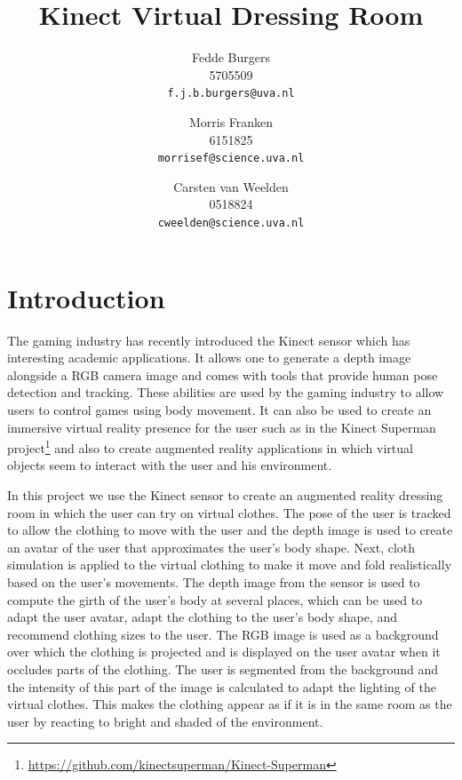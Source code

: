 \documentclass[a4paper]{article}
\title{Kinect Virtual Dressing Room}
\author{Fedde Burgers \\ 5705509 \\ \texttt{f.j.b.burgers@uva.nl} \and Morris Franken \\ 6151825 \\ \texttt{morrisef@science.uva.nl} \and Carsten van Weelden \\ 0518824 \\ \texttt{cweelden@science.uva.nl}}
\begin{document}
\maketitle

\begin{abstract}

\end{abstract}

\par{}

\section{Introduction}

The gaming industry has recently introduced the Kinect sensor which has interesting academic applications. It allows one to generate a depth image alongside a RGB camera image and comes with tools that provide human pose detection and tracking. These abilities are used by the gaming industry to allow users to control games using body movement. It can also be used to create an immersive virtual reality presence for the user such as in the Kinect Superman project\footnote{\url{https://github.com/kinectsuperman/Kinect-Superman}} and also to create augmented reality applications in which virtual objects seem to interact with the user and his environment.

In this project we use the Kinect sensor to create an augmented reality dressing room in which the user can try on virtual clothes. The pose of the user is tracked to allow the clothing to move with the user and the depth image is used to create an avatar of the user that approximates the user's body shape. Next, cloth simulation is applied to the virtual clothing to make it move and fold realistically based on the user's movements. The depth image from the sensor is used to compute the girth of the user's body at several places, which can be used to adapt the user avatar, adapt the clothing to the user's body shape, and recommend clothing sizes to the user. The RGB image is used as a background over which the clothing is projected and is displayed on the user avatar when it occludes parts of the clothing. The user is segmented from the background and the intensity of this part of the image is calculated to adapt the lighting of the virtual clothes. This makes the clothing appear as if it is in the same room as the user by reacting to bright and shaded of the environment.
\end{document}
